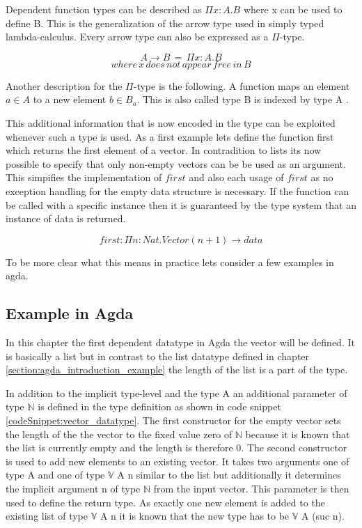 Dependent function types can be described as $\Pi x : A. B$ where x can be used to define B. 
This is the generalization of the arrow type used in simply typed lambda-calculus. Every arrow type can also be expressed as a $\Pi$-type.

$$A \rightarrow B \, = \, \Pi x:A.B$$
$$where \, x \, does \, not \, appear \, free \, in \, B$$

Another description for the $\Pi$-type is the following. A function maps an element $a \in A$ to a new element $b \in B_a$. 
This is also called type B is indexed by type A \cite{10.1145/2841316}.

This additional information that is now encoded in the type can be exploited whenever such a type is used. As a first example lets define the function first which returns the first element of a vector.
In contradition to lists its now possible to specify that only non-empty vectors can be be used as an argument. 
This simpifies the implementation of $first$ and also each usage of $first$ as no exception handling for the empty data structure is necessary. 
If the function can be called with a specific instance then it is guaranteed by the type system that an instance of data is returned.

$$first : \Pi n : Nat.Vector(n+1) \rightarrow data$$

To be more clear what this means in practice lets consider a few examples in agda.

\subsection{Example in Agda}\label{section_dependent_types_example}
In this chapter the first dependent datatype in Agda the vector will be defined.
It is basically a list but in contrast to the list datatype defined in chapter \ref{section:agda_introduction_example} the length of the list is a part of the type.

In addition to the implicit type-level and the type A an additional parameter of type $\mathbb{N}$ is defined in the type definition as shown in code snippet \ref{codeSnippet:vector_datatype}.
The first constructor for the empty vector sets the length of the the vector to the fixed value zero of $\mathbb{N}$ because it is known that the list is currently empty and the length is therefore 0.
The second constructor is used to add new elements to an existing vector. It takes two arguments one of type A and one of type $\mathbb{V}$ A n similar to the list but additionally it determines the implicit argument n of type $\mathbb{N}$ from the input vector.
This parameter is then used to define the return type. As exactly one new element is added to the existing list of type $\mathbb{V}$ A n it is known that the new type has to be $\mathbb{V}$ A (suc n).

